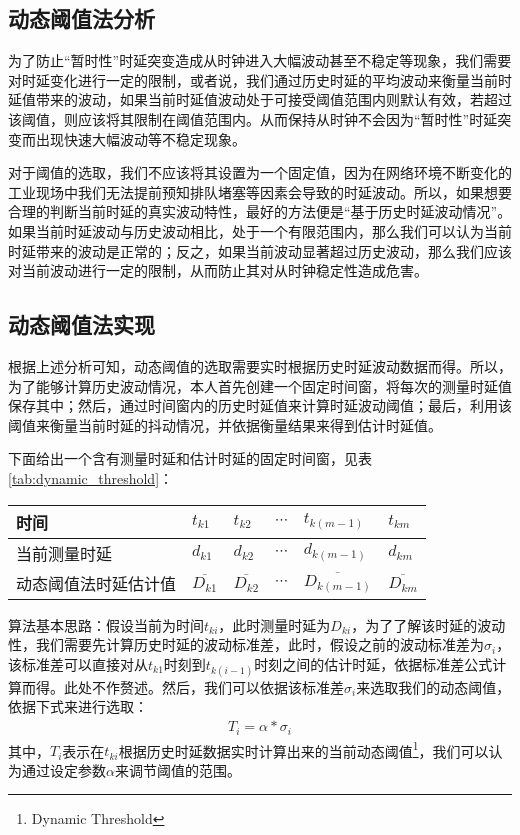 \subsection{动态阈值法分析}
为了防止“暂时性”时延突变造成从时钟进入大幅波动甚至不稳定等现象，我们需要对时延变化进行一定的限制，或者说，我们通过历史时延的平均波动来衡量当前时延值带来的波动，如果当前时延值波动处于可接受阈值范围内则默认有效，若超过该阈值，则应该将其限制在阈值范围内。从而保持从时钟不会因为“暂时性”时延突变而出现快速大幅波动等不稳定现象。

对于阈值的选取，我们不应该将其设置为一个固定值，因为在网络环境不断变化的工业现场中我们无法提前预知排队堵塞等因素会导致的时延波动。所以，如果想要合理的判断当前时延的真实波动特性，最好的方法便是“基于历史时延波动情况”。如果当前时延波动与历史波动相比，处于一个有限范围内，那么我们可以认为当前时延带来的波动是正常的；反之，如果当前波动显著超过历史波动，那么我们应该对当前波动进行一定的限制，从而防止其对从时钟稳定性造成危害。

\subsection{动态阈值法实现}
根据上述分析可知，动态阈值的选取需要实时根据历史时延波动数据而得。所以，为了能够计算历史波动情况，本人首先创建一个固定时间窗，将每次的测量时延值保存其中；然后，通过时间窗内的历史时延值来计算时延波动阈值；最后，利用该阈值来衡量当前时延的抖动情况，并依据衡量结果来得到估计时延值。

下面给出一个含有测量时延和估计时延的固定时间窗，见表\ref{tab:dynamic_threshold}：
\begin{table}[!hpb]
  \centering
  \begin{tabular}{llllll} \toprule
  	时间 & $t_{k1}$ & $t_{k2}$ & $\cdots$ & $t_{k(m-1)}$ & $t_{km}$ \\ \midrule
    当前测量时延 & $d_{k1}$ & $d_{k2}$ & $\cdots$ & $d_{k(m-1)}$ & $d_{km}$ \\ \midrule
    动态阈值法时延估计值 & $\overline{D_{k1}}$ & $\overline{D_{k2}}$ & $\cdots$ & $\overline{D_{k(m-1)}}$ & $\overline{D_{km}}$  \\ \bottomrule
  \end{tabular}
\end{table}

算法基本思路：假设当前为时间$t_{ki}$，此时测量时延为$D_{ki}$，为了了解该时延的波动性，我们需要先计算历史时延的波动标准差，此时，假设之前的波动标准差为$\sigma_{i}$，该标准差可以直接对从$t_{k1}$时刻到$t_{k(i-1)}$时刻之间的估计时延，依据标准差公式计算而得。此处不作赘述。然后，我们可以依据该标准差$\sigma_{i}$来选取我们的动态阈值，依据下式来进行选取：
\begin{align}
T_{i} = \alpha * \sigma_{i}
\end{align}
其中，$T_{i}$表示在$t_{ki}$根据历史时延数据实时计算出来的当前动态阈值\footnote{Dynamic Threshold}，我们可以认为通过设定参数$\alpha$来调节阈值的范围。

